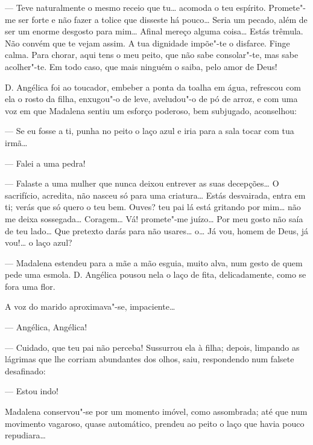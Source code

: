 --- Teve naturalmente o mesmo receio que tu\ldots{} acomoda o teu espírito.
Promete"-me ser forte e não fazer a tolice que disseste há pouco\ldots{} Seria
um pecado, além de ser um enorme desgosto para mim\ldots{} Afinal mereço
alguma coisa\ldots{} Estás trêmula. Não convém que te vejam assim. A tua
dignidade impõe"-te o disfarce. Finge calma. Para chorar, aqui tens o meu
peito, que não sabe consolar"-te, mas sabe acolher"-te. Em todo caso, que
mais ninguém o saiba, pelo amor de Deus!

D. Angélica foi ao toucador, embeber a ponta da toalha em água,
refrescou com ela o rosto da filha, enxugou"-o de leve, aveludou"-o de pó
de arroz, e com uma voz em que Madalena sentiu um esforço poderoso, bem
subjugado, aconselhou:

--- Se eu fosse a ti, punha no peito o laço azul e iria para a sala
tocar com tua irmã\ldots{}

--- Falei a uma pedra!

--- Falaste a uma mulher que nunca deixou entrever as suas decepções\ldots{}
O sacrifício, acredita, não nasceu só para uma criatura\ldots{} Estás
desvairada, entra em ti; verás que só quero o teu bem. Ouves? teu pai lá
está gritando por mim\ldots{} não me deixa sossegada\ldots{} Coragem\ldots{} Vá!
promete"-me juízo\ldots{} Por meu gosto não saía de teu lado\ldots{} Que pretexto
darás para não usares\ldots{} o\ldots{} Já vou, homem de Deus, já vou!\ldots{} o laço
azul?

--- Madalena estendeu para a mãe a mão esguia, muito alva, num gesto de
quem pede uma esmola. D. Angélica pousou nela o laço de fita,
delicadamente, como se fora uma flor.

A voz do marido aproximava"-se, impaciente\ldots{}

--- Angélica, Angélica!

--- Cuidado, que teu pai não perceba! Sussurrou ela à filha; depois,
limpando as lágrimas que lhe corriam abundantes dos olhos, saiu,
respondendo num falsete desafinado:

--- Estou indo!

Madalena conservou"-se por um momento imóvel, como assombrada; até que
num movimento vagaroso, quase automático, prendeu ao peito o laço que
havia pouco repudiara\ldots{}


